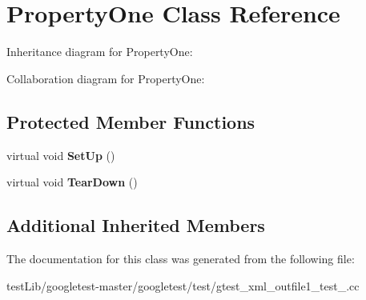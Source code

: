 \hypertarget{classPropertyOne}{}\section{Property\+One Class Reference}
\label{classPropertyOne}


Inheritance diagram for Property\+One\+:


Collaboration diagram for Property\+One\+:
\subsection*{Protected Member Functions}
\begin{DoxyCompactItemize}
\item 
\mbox{\label{classPropertyOne_a9cb7d7cb508d5f1a6fc7cfead81ebc2b}} 
virtual void {\bfseries Set\+Up} ()
\item 
\mbox{\label{classPropertyOne_a3ed895113848403d5ea27f52a1bb0545}} 
virtual void {\bfseries Tear\+Down} ()
\end{DoxyCompactItemize}
\subsection*{Additional Inherited Members}


The documentation for this class was generated from the following file\+:\begin{DoxyCompactItemize}
\item 
test\+Lib/googletest-\/master/googletest/test/gtest\+\_\+xml\+\_\+outfile1\+\_\+test\+\_\+.\+cc\end{DoxyCompactItemize}
